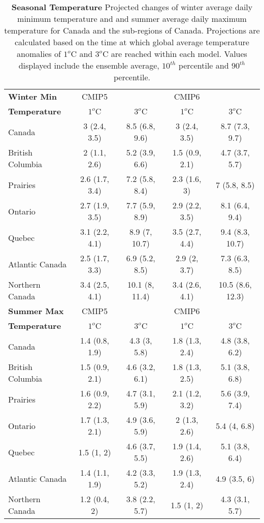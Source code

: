 \documentclass[]{scrartcl}
\begin{document}
\begin{table}[t]
	\caption{\textbf{Seasonal Temperature} Projected changes of winter average daily minimum temperature and and summer average daily maximum temperature for Canada and the sub-regions of Canada. Projections are calculated based on the time at which global average temperature anomalies of $1^o$C and $3^o$C are reached within each model. Values displayed include the ensemble average, $10^{th}$ percentile and $90^{th}$ percentile.}\label{table:deg_seas_tas}
	\begin{center}
		\begin{tabularx}{\linewidth}{|L|cc|cc|} 
			\hline
			\textbf{Winter Min} & CMIP5 &  & CMIP6 &   \\
			\textbf{Temperature} & $1^o$C & $3^o$C & $1^o$C & $3^o$C \\
			\hline
			Canada & 3 (2.4, 3.5) & 8.5 (6.8, 9.6) & 3 (2.4, 3.5) & 8.7 (7.3, 9.7) \\ 
			British Columbia & 2 (1.1, 2.6) & 5.2 (3.9, 6.6) & 1.5 (0.9, 2.1) & 4.7 (3.7, 5.7) \\ 
			Prairies & 2.6 (1.7, 3.4) & 7.2 (5.8, 8.4) & 2.3 (1.6, 3) & 7 (5.8, 8.5) \\ 
			Ontario & 2.7 (1.9, 3.5) & 7.7 (5.9, 8.9) & 2.9 (2.2, 3.5) & 8.1 (6.4, 9.4) \\ 
			Quebec & 3.1 (2.2, 4.1) & 8.9 (7, 10.7) & 3.5 (2.7, 4.4) & 9.4 (8.3, 10.7) \\ 
			Atlantic Canada & 2.5 (1.7, 3.3) & 6.9 (5.2, 8.5) & 2.9 (2, 3.7) & 7.3 (6.3, 8.5) \\ 
			Northern Canada & 3.4 (2.5, 4.1) & 10.1 (8, 11.4) & 3.4 (2.6, 4.1) & 10.5 (8.6, 12.3) \\ 
			\hline
			\textbf{Summer Max} & CMIP5 &  & CMIP6 &   \\
			\textbf{Temperature} & $1^o$C & $3^o$C & $1^o$C & $3^o$C \\	
			\hline
			Canada & 1.4 (0.8, 1.9) & 4.3 (3, 5.8) & 1.8 (1.3, 2.4) & 4.8 (3.8, 6.2) \\ 
			British Columbia & 1.5 (0.9, 2.1) & 4.6 (3.2, 6.1) & 1.8 (1.3, 2.5) & 5.1 (3.8, 6.8) \\ 
			Prairies & 1.6 (0.9, 2.2) & 4.7 (3.1, 5.9) & 2.1 (1.2, 3.2) & 5.6 (3.9, 7.4) \\ 
			Ontario & 1.7 (1.3, 2.1) & 4.9 (3.6, 5.9) & 2 (1.3, 2.6) & 5.4 (4, 6.8) \\ 
			Quebec & 1.5 (1, 2) & 4.6 (3.7, 5.5) & 1.9 (1.4, 2.6) & 5.1 (3.8, 6.4) \\ 
			Atlantic Canada & 1.4 (1.1, 1.9) & 4.2 (3.3, 5.2) & 1.9 (1.3, 2.4) & 4.9 (3.5, 6) \\ 
			Northern Canada & 1.2 (0.4, 2) & 3.8 (2.2, 5.7) & 1.5 (1, 2) & 4.3 (3.1, 5.7) \\ 
			\hline	
		\end{tabularx}
	\end{center}
\end{table}
\end{document}
